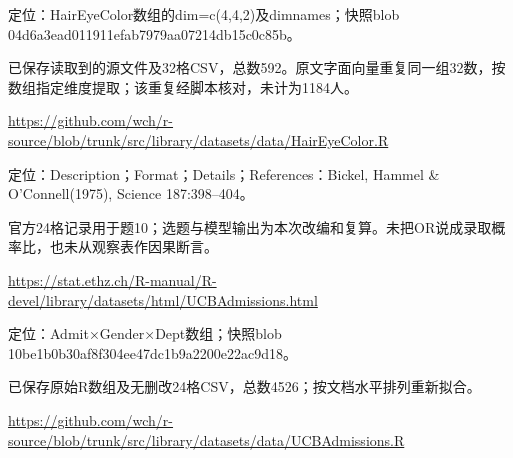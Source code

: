 \par\noindent\begin{minipage}{\linewidth}\raggedright{}\label{src:G6-HAIR-DATA}
\par
定位：HairEyeColor数组的dim=c(4,4,2)及dimnames；快照blob 04d6a3ead011911efab7979aa07214db15c0c85b。\par
已保存读取到的源文件及32格CSV，总数592。原文字面向量重复同一组32数，按数组指定维度提取；该重复经脚本核对，未计为1184人。\par
{\small \url{https://github.com/wch/r-source/blob/trunk/src/library/datasets/data/HairEyeColor.R}}\par
\end{minipage}\par\medskip

\par\noindent\begin{minipage}{\linewidth}\raggedright{}\label{src:G6-UCB}
\par
定位：Description；Format；Details；References：Bickel, Hammel \& O’Connell(1975), Science 187:398–404。\par
官方24格记录用于题10；选题与模型输出为本次改编和复算。未把OR说成录取概率比，也未从观察表作因果断言。\par
{\small \url{https://stat.ethz.ch/R-manual/R-devel/library/datasets/html/UCBAdmissions.html}}\par
\end{minipage}\par\medskip

\par\noindent\begin{minipage}{\linewidth}\raggedright{}\label{src:G6-UCB-DATA}
\par
定位：Admit×Gender×Dept数组；快照blob 10be1b0b30af8f304ee47dc1b9a2200e22ac9d18。\par
已保存原始R数组及无删改24格CSV，总数4526；按文档水平排列重新拟合。\par
{\small \url{https://github.com/wch/r-source/blob/trunk/src/library/datasets/data/UCBAdmissions.R}}\par
\end{minipage}\par\medskip

